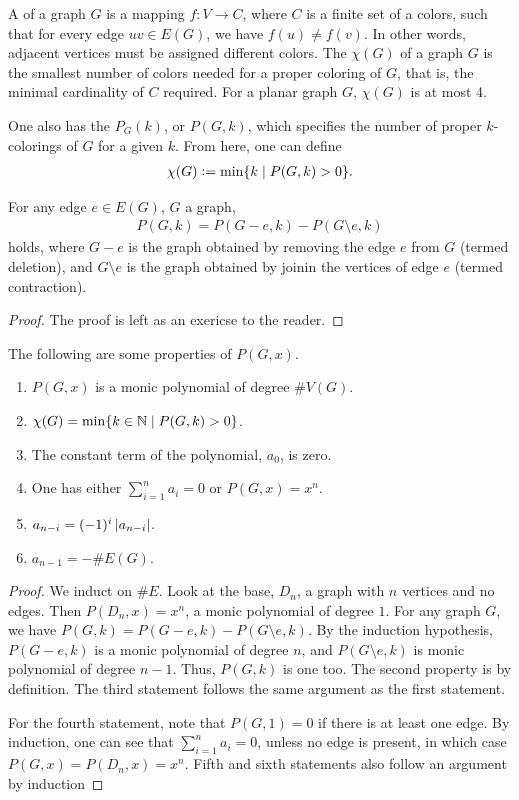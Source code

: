 A  of a graph $G$ is a mapping $f:V \to C$, where $C$ is a finite set of a colors, such that for every edge $uv \in E(G)$, we have $f(u) \neq f(v)$. In other words, adjacent vertices must be assigned different colors. The  $\chi(G)$ of a graph $G$ is the smallest number of colors needed for a proper coloring of $G$, that is, the minimal cardinality of $C$ required. For a planar graph $G$, $\chi(G)$ is at most 4.

One also has the  $P_{G}(k)$, or $P(G,k)$, which specifies the number of proper $k$-colorings of $G$ for a given $k$. From here, one can define
\begin{align}
    \chi(G) \vcentcolon= \min\{k \mid P(G,k) > 0\}.
\end{align}

\begin{proposition}
    For any edge $e \in E(G)$, $G$ a graph,
    \begin{align}
        P(G,k) = P(G-e,k)-P(G\setminus e,k)
    \end{align}
    holds, where $G-e$ is the graph obtained by removing the edge $e$ from $G$ (termed deletion), and $G\setminus e$ is the graph obtained by joinin the vertices of edge $e$ (termed contraction).
\end{proposition}
\begin{proof}
    The proof is left as an exericse to the reader.
\end{proof}
The following are some properties of $P(G,x)$.
\begin{enumerate}
    \item $P(G,x)$ is a monic polynomial of degree $\#V(G)$.
    \item $\chi(G) = \min\{k \in \mathbb{N} \mid P(G,k) > 0\}$.
    \item The constant term of the polynomial, $a_{0}$, is zero.
    \item One has either $\sum_{i=1}^{n} a_{i} = 0$ or $P(G,x) = x^{n}$.
    \item $a_{n-i} = (-1)^{i}\left| a_{n-i} \right|$.
    \item $a_{n-1} = -\#E(G)$.
\end{enumerate}

\begin{proof}
    We induct on $\#E$. Look at the base, $D_{n}$, a graph with $n$ vertices and no edges. Then $P(D_{n},x) = x^{n}$, a monic polynomial of degree $1$. For any graph $G$, we have $P(G,k)=P(G-e,k)-P(G\setminus e,k)$. By the induction hypothesis, $P(G-e,k)$ is a monic polynomial of degree $n$, and $P(G\setminus e, k)$ is monic polynomial of degree $n-1$. Thus, $P(G,k)$ is one too. The second property is by definition. The third statement follows the same argument as the first statement.

    For the fourth statement, note that $P(G,1) = 0$ if there is at least one edge. By induction, one can see that $\sum_{i=1}^{n} a_{i} = 0$, unless no edge is present, in which case $P(G,x) = P(D_{n},x) = x^{n}$. Fifth and sixth statements also follow an argument by induction
\end{proof}

